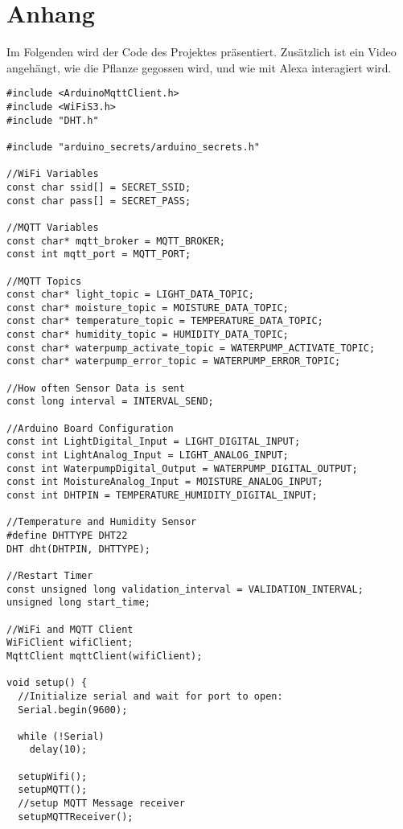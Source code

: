 
\section*{Anhang}

Im Folgenden wird der Code des Projektes präsentiert.
Zusätzlich ist ein Video angehängt, wie die Pflanze gegossen wird, und wie mit Alexa interagiert wird.

\begin{longlisting}
\begin{verbatim}
#include <ArduinoMqttClient.h>
#include <WiFiS3.h>
#include "DHT.h"

#include "arduino_secrets/arduino_secrets.h"

//WiFi Variables
const char ssid[] = SECRET_SSID;   
const char pass[] = SECRET_PASS;   

//MQTT Variables
const char* mqtt_broker = MQTT_BROKER;
const int mqtt_port = MQTT_PORT;

//MQTT Topics
const char* light_topic = LIGHT_DATA_TOPIC;
const char* moisture_topic = MOISTURE_DATA_TOPIC;
const char* temperature_topic = TEMPERATURE_DATA_TOPIC;
const char* humidity_topic = HUMIDITY_DATA_TOPIC;
const char* waterpump_activate_topic = WATERPUMP_ACTIVATE_TOPIC;
const char* waterpump_error_topic = WATERPUMP_ERROR_TOPIC;

//How often Sensor Data is sent
const long interval = INTERVAL_SEND;

//Arduino Board Configuration
const int LightDigital_Input = LIGHT_DIGITAL_INPUT;
const int LightAnalog_Input = LIGHT_ANALOG_INPUT;
const int WaterpumpDigital_Output = WATERPUMP_DIGITAL_OUTPUT;
const int MoistureAnalog_Input = MOISTURE_ANALOG_INPUT;
const int DHTPIN = TEMPERATURE_HUMIDITY_DIGITAL_INPUT;

//Temperature and Humidity Sensor
#define DHTTYPE DHT22
DHT dht(DHTPIN, DHTTYPE);

//Restart Timer
const unsigned long validation_interval = VALIDATION_INTERVAL;
unsigned long start_time;

//WiFi and MQTT Client
WiFiClient wifiClient;
MqttClient mqttClient(wifiClient);

void setup() {
  //Initialize serial and wait for port to open:
  Serial.begin(9600);

  while (!Serial)
    delay(10);

  setupWifi();
  setupMQTT();
  //setup MQTT Message receiver
  setupMQTTReceiver();


\end{verbatim}
\end{longlisting}
